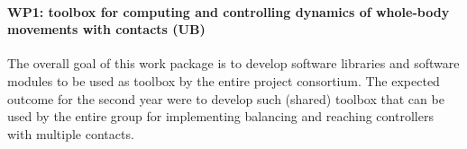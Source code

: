 \paragraph{WP1: toolbox for computing and controlling dynamics of whole-body movements with contacts (UB)}

The overall goal of this work package is to develop software libraries and
software modules to be used as toolbox by the entire project consortium.  The
expected outcome for the second year were to develop such (shared) toolbox
that can be used by the entire group for implementing balancing and reaching
controllers with multiple contacts.

